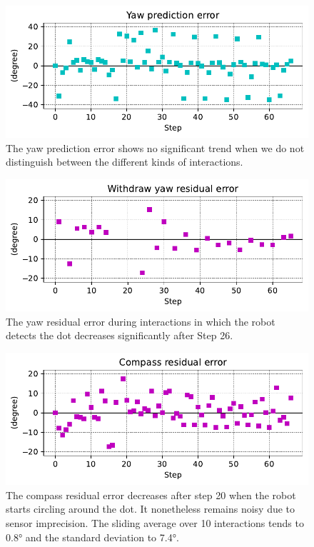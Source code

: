 \documentclass[runningheads]{llncs}
\begin{document}
\begin{figure}
	\includegraphics[width=\textwidth]{02_yaw_pe.pdf}
	\caption{The yaw prediction error shows no significant trend when we do not distinguish between the different kinds of interactions.} \label{fig:yaw_pe}
\end{figure}

\begin{figure}
	\includegraphics[width=\textwidth]{03_yaw_re.pdf}
	\caption{The yaw residual error during interactions in which the robot detects the dot decreases significantly after Step 26.} \label{fig:yaw_re}
\end{figure}

\begin{figure}
	\includegraphics[width=\textwidth]{04_Compass.pdf}
	\caption{The compass residual error decreases after step 20 when the robot starts circling around the dot.
	It nonetheless remains noisy due to sensor imprecision.
	The sliding average over 10 interactions tends to 0.8° and the standard deviation to 7.4°.} \label{fig:compass}
\end{figure}
\end{document}
